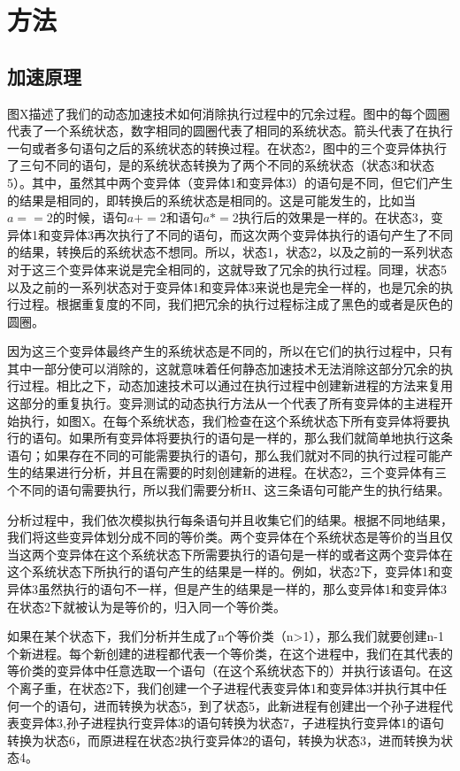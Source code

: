 \documentclass[nofonts]{ctexrep}
\begin{document}
\chapter{方法}
\section{加速原理}
图X描述了我们的动态加速技术如何消除执行过程中的冗余过程。图中的每个圆圈代表了一个系统状态，数字相同的圆圈代表了相同的系统状态。箭头代表了在执行一句或者多句语句之后的系统状态的转换过程。在状态2，图中的三个变异体执行了三句不同的语句，是的系统状态转换为了两个不同的系统状态（状态3和状态5）。其中，虽然其中两个变异体（变异体1和变异体3）的语句是不同，但它们产生的结果是相同的，即转换后的系统状态是相同的。这是可能发生的，比如当$a==2$的时候，语句$a+=2$和语句$a*=2$执行后的效果是一样的。在状态3，变异体1和变异体3再次执行了不同的语句，而这次两个变异体执行的语句产生了不同的结果，转换后的系统状态不想同。所以，状态1，状态2，以及之前的一系列状态对于这三个变异体来说是完全相同的，这就导致了冗余的执行过程。同理，状态5以及之前的一系列状态对于变异体1和变异体3来说也是完全一样的，也是冗余的执行过程。根据重复度的不同，我们把冗余的执行过程标注成了黑色的或者是灰色的圆圈。

因为这三个变异体最终产生的系统状态是不同的，所以在它们的执行过程中，只有其中一部分使可以消除的，这就意味着任何静态加速技术无法消除这部分冗余的执行过程。相比之下，动态加速技术可以通过在执行过程中创建新进程的方法来复用这部分的重复执行。变异测试的动态执行方法从一个代表了所有变异体的主进程开始执行，如图X。在每个系统状态，我们检查在这个系统状态下所有变异体将要执行的语句。如果所有变异体将要执行的语句是一样的，那么我们就简单地执行这条语句；如果存在不同的可能需要执行的语句，那么我们就对不同的执行过程可能产生的结果进行分析，并且在需要的时刻创建新的进程。在状态2，三个变异体有三个不同的语句需要执行，所以我们需要分析H、这三条语句可能产生的执行结果。

分析过程中，我们依次模拟执行每条语句并且收集它们的结果。根据不同地结果，我们将这些变异体划分成不同的等价类。两个变异体在个系统状态是等价的当且仅当这两个变异体在这个系统状态下所需要执行的语句是一样的或者这两个变异体在这个系统状态下所执行的语句产生的结果是一样的。例如，状态2下，变异体1和变异体3虽然执行的语句不一样，但是产生的结果是一样的，那么变异体1和变异体3在状态2下就被认为是等价的，归入同一个等价类。

如果在某个状态下，我们分析并生成了n个等价类（n>1），那么我们就要创建n-1个新进程。每个新创建的进程都代表一个等价类，在这个进程中，我们在其代表的等价类的变异体中任意选取一个语句（在这个系统状态下的）并执行该语句。在这个离子重，在状态2下，我们创建一个子进程代表变异体1和变异体3并执行其中任何一个的语句，进而转换为状态5，到了状态5，此新进程有创建出一个孙子进程代表变异体3,孙子进程执行变异体3的语句转换为状态7，子进程执行变异体1的语句转换为状态6，而原进程在状态2执行变异体2的语句，转换为状态3，进而转换为状态4。
\end{document}
